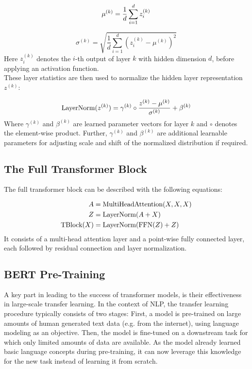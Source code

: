 \begin{equation}
    \mu^{(k)} = \frac{1}{d} \sum_{i=1}^d z_i^{(k)}
\end{equation}

\begin{equation}
    \sigma^{(k)} = \sqrt{\frac{1}{d} \sum_{i=1}^d (z_i^{(k)} - \mu^{(k)})^2}
\end{equation}
Here $z_i^{(k)}$ denotes the $i$-th output of layer $k$ with hidden dimension $d$, before applying an activation function.\\
These layer statistics are then used to normalize the hidden layer representation $z^{(k)}$:

\begin{equation}
    \text{LayerNorm}(z^{(k)}) = \gamma ^{(k)} \circ \frac{z^{(k)} - \mu^{(k)}}{\sigma^{(k)}} + \beta^{(k)}
\end{equation}
Where $\gamma^{(k)}$ and $\beta^{(k)}$ are learned parameter vectors for layer $k$ and $\circ$ denotes the element-wise product. Further, $\gamma^{(k)}$ and $\beta^{(k)}$ are additional learnable parameters for adjusting scale and shift of the normalized distribution if required.

\subsection{The Full Transformer Block}

The full transformer block can be described with the following equations:

\begin{align}
    A              & = \text{MultiHeadAttention}(X, X, X) \\
    Z              & = \text{LayerNorm}(A + X)            \\
    \text{TBlock}(X) & = \text{LayerNorm}(\text{FFN}(Z) + Z)
\end{align}
It consists of a multi-head attention layer and a point-wise fully connected layer, each followed by residual connection and layer normalization.


\subsection{BERT Pre-Training}
A key part in leading to the success of transformer models, is their effectiveness in large-scale transfer learning. In the context of NLP, the transfer learning procedure typically consists of two stages: First, a model is pre-trained on large amounts of human generated text data (e.g. from the internet), using language modeling as an objective. Then, the model is fine-tuned on a downstream task for which only limited amounts of data are available. As the model already learned basic language concepts during pre-training, it can now leverage this knowledge for the new task instead of learning it from scratch.

